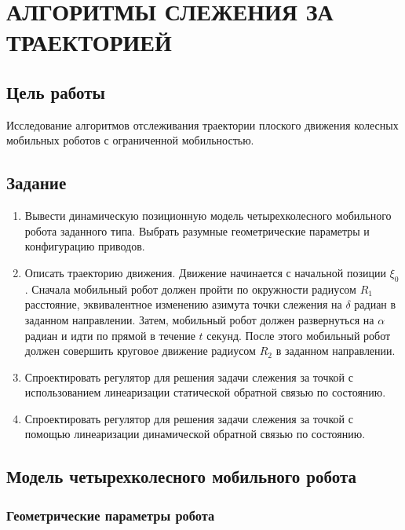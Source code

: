 \chapter{АЛГОРИТМЫ СЛЕЖЕНИЯ ЗА ТРАЕКТОРИЕЙ}

\section{Цель работы}

Исследование алгоритмов отслеживания траектории плоского движения колесных мобильных роботов с ограниченной мобильностью.

\section{Задание}

\begin{enumerate}
\item Вывести динамическую позиционную модель четырехколесного мобильного робота заданного типа. Выбрать разумные геометрические параметры и конфигурацию приводов.

\item Описать траекторию движения. Движение начинается с начальной позиции $\xi_0$. Сначала мобильный робот должен пройти по окружности радиусом $R_1$ расстояние, эквивалентное изменению азимута точки слежения на $\delta$ радиан в заданном направлении. Затем, мобильный робот должен развернуться на $\alpha$ радиан и идти по прямой в течение $t$ секунд. После этого мобильный робот должен совершить круговое движение радиусом $R_2$ в заданном направлении.

\item Спроектировать регулятор для решения задачи слежения за точкой с использованием линеаризации статической обратной связью по состоянию.

\item Спроектировать регулятор для решения задачи слежения за точкой с помощью линеаризации динамической обратной связью по состоянию.
\end{enumerate}

\section{Модель четырехколесного мобильного робота}

\subsection{Геометрические параметры робота}

